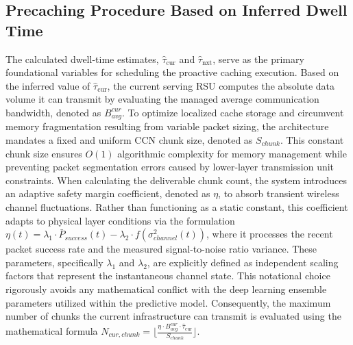 \documentclass[journal]{IEEEtran}
\begin{document}
\subsection{Precaching Procedure Based on Inferred Dwell Time} \label{sec.prop.C}
The calculated dwell-time estimates, $\hat{\tau}_{\text{cur}}$ and $\hat{\tau}_{\text{nxt}}$, serve as the primary foundational variables for scheduling the proactive caching execution.
Based on the inferred value of $\hat{\tau}_{\text{cur}}$, the current serving RSU computes the absolute data volume it can transmit by evaluating the managed average communication bandwidth, denoted as $B_{avg}^{cur}$.
To optimize localized cache storage and circumvent memory fragmentation resulting from variable packet sizing, the architecture mandates a fixed and uniform CCN chunk size, denoted as $S_{chunk}$.
This constant chunk size ensures $O(1)$ algorithmic complexity for memory management while preventing packet segmentation errors caused by lower-layer transmission unit constraints.
When calculating the deliverable chunk count, the system introduces an adaptive safety margin coefficient, denoted as $\eta$, to absorb transient wireless channel fluctuations.
Rather than functioning as a static constant, this coefficient adapts to physical layer conditions via the formulation $\eta(t) = \lambda_1 \cdot \bar{P}_{success}(t) - \lambda_2 \cdot f(\sigma_{channel}^2(t))$, where it processes the recent packet success rate and the measured signal-to-noise ratio variance.
These parameters, specifically $\lambda_1$ and $\lambda_2$, are explicitly defined as independent scaling factors that represent the instantaneous channel state.
This notational choice rigorously avoids any mathematical conflict with the deep learning ensemble parameters utilized within the predictive model.
Consequently, the maximum number of chunks the current infrastructure can transmit is evaluated using the mathematical formula $N_{cur, chunk} = \lfloor \frac{\eta \cdot B_{avg}^{cur} \cdot \hat{\tau}_{\text{cur}}}{S_{chunk}} \rfloor$.
\end{document}
